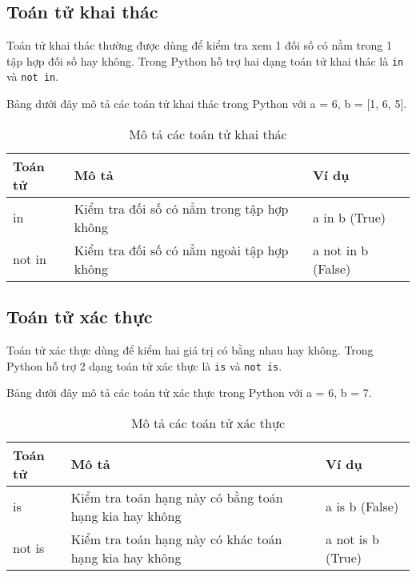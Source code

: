 \subsection{Toán tử khai thác}
\label{kt}
Toán tử khai thác thường được dùng để kiểm tra xem 1 đối số có nằm trong 1 tập hợp đối số hay không. Trong Python hỗ trợ hai dạng toán tử khai thác là \texttt{in} và \texttt{not in}.\par
Bảng dưới đây mô tả các toán tử khai thác trong Python với a = 6, b = [1, 6, 5].
\begin{table}[h]
	\centering
	\begin{tabular}{|l||l||l|}
		\hline
		Toán tử & Mô tả & Ví dụ \\
		\hline
		in  & Kiểm tra đối số có nẳm trong tập hợp không & a in b (True) \\
		\hline
		not in & Kiểm tra đối số có nẳm ngoài tập hợp không & a not in b (False) \\
		\hline
	\end{tabular}
	\caption{Mô tả các toán tử khai thác}
\end{table}
\subsection{Toán tử xác thực}
\label{xt}
Toán tử xác thực dùng để kiểm hai giá trị có bằng nhau hay không. Trong Python hỗ trợ 2 dạng toán tử xác thực là \texttt{is} và \texttt{not is}.\par
Bảng dưới đây mô tả các toán tử xác thực trong Python với a = 6, b = 7.
\begin{table}[h]
	\centering
	\begin{tabular}{|l||l||l|}
		\hline
		Toán tử & Mô tả & Ví dụ \\
		\hline
		is  & Kiểm tra toán hạng này có bằng toán hạng kia hay không & a is b (False) \\
		\hline
		not is & Kiểm tra toán hạng này có khác toán hạng kia hay không & a not is b (True) \\
		\hline
	\end{tabular}
	\caption{Mô tả các toán tử xác thực}
\end{table}
\newpage
